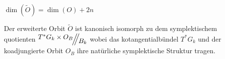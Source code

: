 \begin{beh}
$\dim(\tilde O)=\dim(O)+2n$
\end{beh}
\begin{comment}
\ccite[Lemma 2.13]{thboalch}
\end{comment}
\begin{comment}
\ccite[p27]{thboalch}
\[
\Theta :=\left\{ A\in\mathfrak g_k^*\mid (g_0,A)\in\tilde O
  \text{ für ein passendes } g_0\in\GL_n(\C) \right\}
\]
ist der Kern der Projektion
\[
\tilde O\to\mathfrak g_k^*;\qquad (g_0,A)\mapsto A
\]
\begin{cor}
\ccite[Corollary 2.15]{thboalch}
The extended orbit $\tilde O$ is a principal $T$ bundle over $\theta$.
\end{cor}
\end{comment}
\begin{lem}
Der erweiterte Orbit $\tilde O$ ist kanonisch isomorph zu dem symplektischem
quotienten $\symplquot{T^*G_k\times O_B}{B_k}$ wobei das kotangentialbündel
$T^*G_k$ und der koadjungierte Orbit $O_B$ ihre natürliche symplektische
Struktur tragen.
\begin{comment}
Entspricht
\cite[Proposition 2.19]{thboalch}
zusammen mit
\cite[Remark 2.20]{thboalch}
\end{comment}
\end{lem}
\begin{comment}
Wie sieht denn die $B_k$ Wirkung auf $T^*G_k\times O_B$ aus?
\end{comment}
